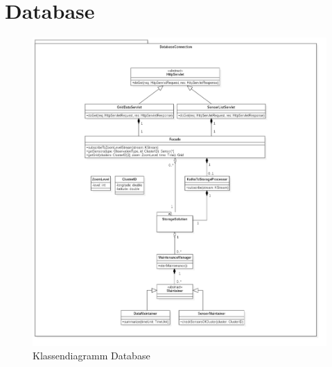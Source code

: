 \chapter{Database}
\begin{figure}[!htp]
	\centering\includegraphics[width=\linewidth]{images/database/DatabaseClassDiagram}
	\caption{Klassendiagramm Database}
\end{figure}

